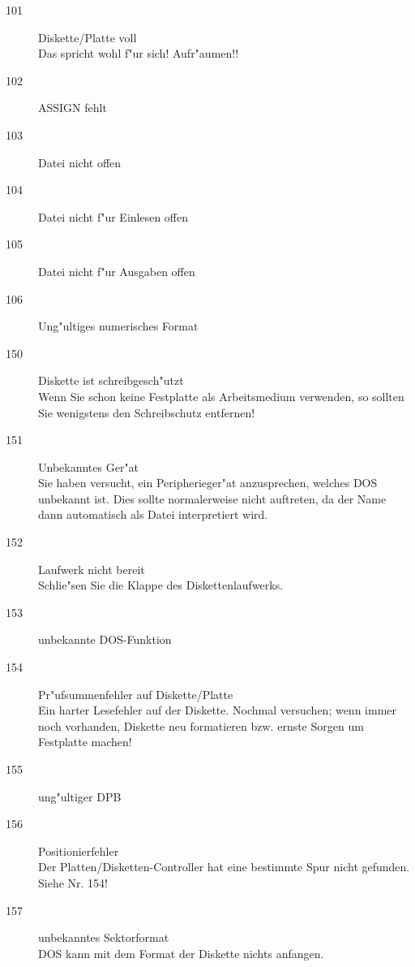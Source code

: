 \documentclass[12pt,a4paper,twoside]{report}
\begin{document}
\begin{description}
\item[101]{Diskette/Platte voll\\
           Das spricht wohl f"ur sich!  Aufr"aumen!!}

\item[102]{ASSIGN fehlt}

\item[103]{Datei nicht offen}

\item[104]{Datei nicht f"ur Einlesen offen}

\item[105]{Datei nicht f"ur Ausgaben offen}

\item[106]{Ung"ultiges numerisches Format}

\item[150]{Diskette ist schreibgesch"utzt\\
           Wenn Sie schon keine Festplatte als Arbeitsmedium verwenden,
           so sollten Sie wenigstens den Schreibschutz entfernen!}

\item[151]{Unbekanntes Ger"at\\
           Sie haben versucht, ein Peripherieger"at anzusprechen, welches
           DOS unbekannt ist.  Dies sollte normalerweise nicht auftreten,
           da der Name dann automatisch als Datei interpretiert wird.}

\item[152]{Laufwerk nicht bereit\\
           Schlie"sen Sie die Klappe des Diskettenlaufwerks.}

\item[153]{unbekannte DOS-Funktion}

\item[154]{Pr"ufsummenfehler auf Diskette/Platte\\
           Ein harter Lesefehler auf der Diskette.  Nochmal versuchen; wenn
           immer noch vorhanden, Diskette neu formatieren bzw. ernste Sorgen
           um Festplatte machen!}

\item[155]{ung"ultiger DPB}

\item[156]{Positionierfehler\\
           Der Platten/Disketten-Controller hat eine bestimmte Spur nicht
           gefunden.  Siehe Nr. 154!}

\item[157]{unbekanntes Sektorformat\\
           DOS kann mit dem Format der Diskette nichts anfangen.}


\end{description}
\end{document}
